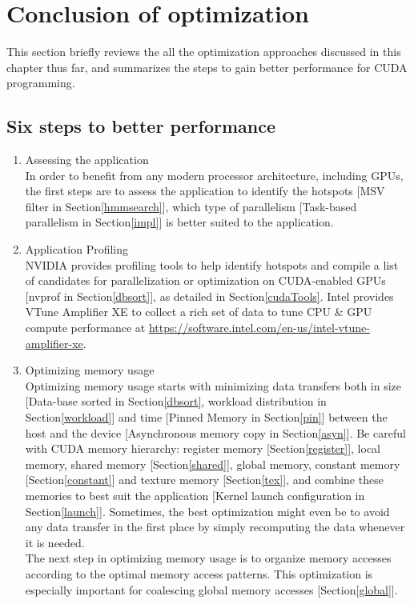 
\section{Conclusion of optimization}

This section briefly reviews the all the optimization approaches discussed in this chapter thus far, and summarizes the steps to gain better performance for CUDA programming.

\subsection*{Six steps to better performance}
\begin{enumerate}
 \item Assessing the application\\
 In order to benefit from any modern processor architecture, including GPUs, the first steps are to assess the application to identify the hotspots [MSV filter in Section\ref{hmmsearch}], which type of parallelism [Task-based parallelism in Section\ref{impl}] is better suited to the application.
 \item Application Profiling\\
 NVIDIA provides profiling tools to help identify hotspots and compile a list of candidates for parallelization or optimization on CUDA-enabled GPUs [nvprof in Section\ref{dbsort}], as detailed in Section\ref{cudaTools}. 
 Intel provides VTune Amplifier XE to collect a rich set of data to tune CPU \& GPU compute performance at \url{https://software.intel.com/en-us/intel-vtune-amplifier-xe}.
 
 \item Optimizing memory usage\\
 Optimizing memory usage starts with minimizing data transfers both in size [Data-base sorted in Section\ref{dbsort}, workload distribution in Section\ref{workload}] and time [Pinned Memory in Section\ref{pin}] between the host and the device [Asynchronous memory copy in Section\ref{asyn}]. Be careful with CUDA memory hierarchy: register memory [Section\ref{register}], local memory, shared memory [Section\ref{shared}], global memory, constant memory [Section\ref{constant}] and texture memory [Section\ref{tex}], and combine these memories to best suit the application [Kernel launch configuration in Section\ref{launch}]. Sometimes, the best optimization might even be to avoid any data transfer in the first place by simply recomputing the data whenever it is needed.\\
 The next step in optimizing memory usage is to organize memory accesses according to the optimal memory access patterns. This optimization is especially important for coalescing global memory accesses [Section\ref{global}].
 

\end{enumerate}
